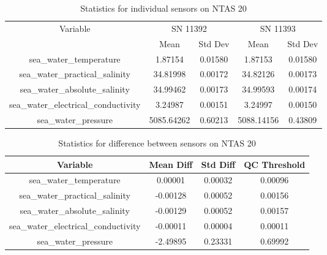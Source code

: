 \begin{table}[h]
\centering
\begin{tabular}{|c|c|c|c|c|}
\hline
Variable & \multicolumn{2}{c|}{SN 11392} & \multicolumn{2}{c|}{SN 11393} \\
& Mean & Std Dev & Mean & Std Dev \\
\hline
sea\_water\_temperature & 1.87154 & 0.01580 & 1.87153 & 0.01580 \\
sea\_water\_practical\_salinity & 34.81998 & 0.00172 & 34.82126 & 0.00173 \\
sea\_water\_absolute\_salinity & 34.99462 & 0.00173 & 34.99593 & 0.00174 \\
sea\_water\_electrical\_conductivity & 3.24987 & 0.00151 & 3.24997 & 0.00150 \\
sea\_water\_pressure & 5085.64262 & 0.60213 & 5088.14156 & 0.43809 \\
\hline
\end{tabular}
\caption{Statistics for individual sensors on NTAS 20}
\end{table}

\begin{table}[h]
\centering
\begin{tabular}{|c|c|c|c|}
\hline
Variable & Mean Diff & Std Diff & QC Threshold \\
\hline
sea\_water\_temperature & 0.00001 & 0.00032 & 0.00096 \\
sea\_water\_practical\_salinity & -0.00128 & 0.00052 & 0.00156 \\
sea\_water\_absolute\_salinity & -0.00129 & 0.00052 & 0.00157 \\
sea\_water\_electrical\_conductivity & -0.00011 & 0.00004 & 0.00011 \\
sea\_water\_pressure & -2.49895 & 0.23331 & 0.69992 \\
\hline
\end{tabular}
\caption{Statistics for difference between sensors on NTAS 20}
\end{table}
